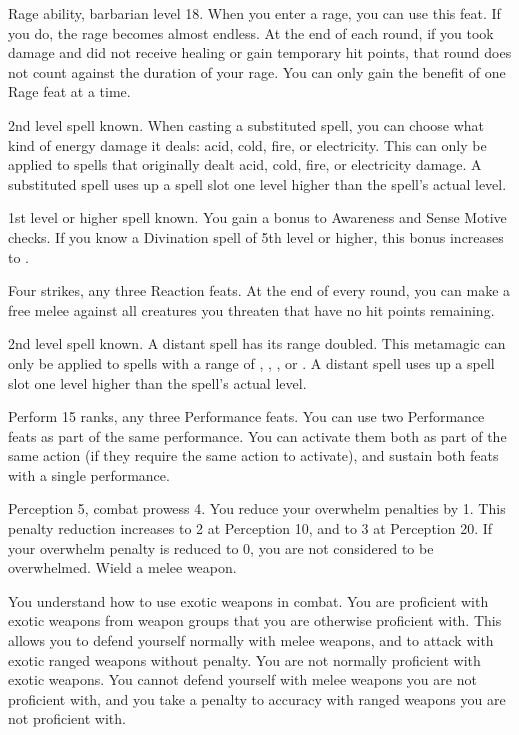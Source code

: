 \featpres Rage ability, barbarian level 18.
\featben When you enter a rage, you can use this feat. If you do, the rage becomes almost endless. At the end of each round, if you took damage and did not receive healing or gain temporary hit points, that round does not count against the duration of your rage.
 You can only gain the benefit of one Rage feat at a time.

\featpre 2nd level spell known.
\featben When casting a substituted spell, you can choose what kind of energy damage it deals: acid, cold, fire, or electricity.
This can only be applied to spells that originally dealt acid, cold, fire, or electricity damage.
A substituted spell uses up a spell slot one level higher than the spell's actual level.

\featpre 1st level or higher  spell known.
\featben You gain a  bonus to Awareness and Sense Motive checks.
If you know a Divination spell of 5th level or higher, this bonus increases to .

\featpres Four strikes, any three Reaction feats.
\featben At the end of every round, you can make a free melee  against all creatures you threaten that have no hit points remaining.

\featpre 2nd level spell known.
\featben A distant spell has its range doubled.
This metamagic can only be applied to spells with a range of \rngclose, \rngmed, \rnglong, or \rngext.
A distant spell uses up a spell slot one level higher than the spell's actual level.

\featpres Perform 15 ranks, any three Performance feats.
\featben You can use two Performance feats as part of the same performance.
You can activate them both as part of the same action (if they require the same action to activate), and sustain both feats with a single performance.

\featpres Perception 5, combat prowess 4.
\featben You reduce your overwhelm penalties by 1.
This penalty reduction increases to 2 at Perception 10, and to 3 at Perception 20.
If your overwhelm penalty is reduced to 0, you are not considered to be overwhelmed.
\featpre Wield a melee weapon.

You understand how to use exotic weapons in combat.
\featben You are proficient with exotic weapons from weapon groups that you are otherwise proficient with.
This allows you to defend yourself normally with melee weapons, and to attack with exotic ranged weapons without penalty.
You are not normally proficient with exotic weapons.
You cannot defend yourself with melee weapons you are not proficient with, and you take a  penalty to accuracy with ranged weapons you are not proficient with.


